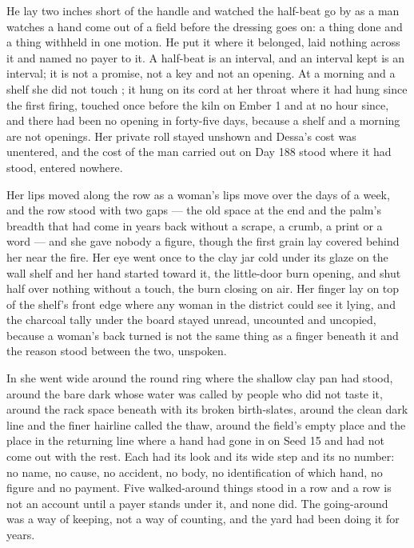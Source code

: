 He lay two inches short of the handle and watched the half-beat go by as a man watches a hand come out of a field before the dressing goes on: a thing done and a thing withheld in one motion. He put it where it belonged, laid nothing across it and named no payer to it. A half-beat is an interval, and an interval kept is an interval; it is not a promise, not a key and not an opening. At a morning and a shelf she did not touch ; it hung on its cord at her throat where it had hung since the first firing, touched once before the kiln on Ember 1 and at no hour since, and there had been no opening in forty-five days, because a shelf and a morning are not openings. Her private roll stayed unshown and Dessa's cost was unentered, and the cost of the man carried out on Day 188 stood where it had stood, entered nowhere.

Her lips moved along the row as a woman's lips move over the days of a week, and the row stood with two gaps --- the old space at the end and the palm's breadth that had come in years back without a scrape, a crumb, a print or a word --- and she gave nobody a figure, though the first grain lay covered behind her near the fire. Her eye went once to the clay jar cold under its glaze on the wall shelf and her hand started toward it, the little-door burn opening, and shut half over nothing without a touch, the burn closing on air. Her finger lay on top of the shelf's front edge where any woman in the district could see it lying, and the charcoal tally under the board stayed unread, uncounted and uncopied, because a woman's back turned is not the same thing as a finger beneath it and the reason stood between the two, unspoken.

\scenebreak

In  she went wide around the round ring where the shallow clay pan had stood, around the bare dark  whose water was called  by people who did not taste it, around the rack space beneath  with its broken birth-slates, around the clean dark line and the finer hairline called the thaw, around the field's empty place and the place in the returning line where a hand had gone in on Seed 15 and had not come out with the rest. Each had its look and its wide step and its no number: no name, no cause, no accident, no body, no identification of which hand, no figure and no payment. Five walked-around things stood in a row and a row is not an account until a payer stands under it, and none did. The going-around was a way of keeping, not a way of counting, and the yard had been doing it for years.

